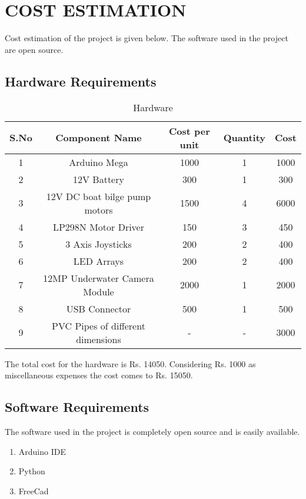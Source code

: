 \chapter{COST ESTIMATION}\thispagestyle{EmptyHeader}
\label{chp:3}
Cost estimation of the project is given below. The software used in the project are open source.

\section{Hardware Requirements}

\begin{table}[ht]
	\caption{Hardware}
	\label{tab1}
	\centering
\begin{tabular}{|c|c|c|c|c|}
		
	\hline
	S.No & Component Name & Cost per unit & Quantity & Cost \\
	\hline
	1 & Arduino Mega & 1000 & 1 & 1000 \\
	\hline
	2 & 12V Battery & 300 & 1 & 300\\
	\hline
	3 & 12V DC boat bilge pump motors & 1500 & 4 & 6000\\
	\hline
	4 & LP298N Motor Driver & 150 & 3 & 450\\
	\hline
	5 & 3 Axis Joysticks & 200 & 2 & 400\\
	\hline
	6 & LED Arrays & 200 & 2 & 400\\
	\hline
	7 & 12MP Underwater Camera Module & 2000 & 1 & 2000\\
	\hline
	8 & USB Connector & 500 & 1 & 500\\
	\hline
	9 & PVC Pipes of different dimensions & - & - & 3000\\
	\hline
	
\end{tabular}
\end{table}
 The total cost for the hardware is Rs. 14050. Considering Rs. 1000 as miscellaneous expenses the cost comes to Rs. 15050.
 \section{Software Requirements}
 The software used in the project is completely open source and is easily available.
 \begin{enumerate}
     \item Arduino IDE
     \item Python
     \item FreeCad
 \end{enumerate}